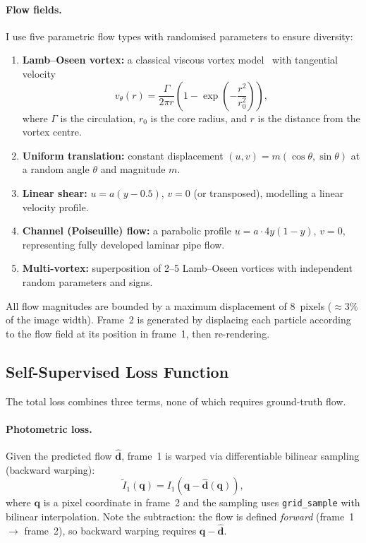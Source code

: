 \documentclass[11pt, a4paper]{article}
\newcommand{\vect}[1]{\bm{#1}}
\begin{document}
\paragraph{Flow fields.}
I use five parametric flow types with randomised parameters to ensure diversity:
\begin{enumerate}
    \item \textbf{Lamb--Oseen vortex:} a classical viscous vortex model~\cite{lamb1932hydrodynamics} with tangential velocity
    \begin{equation}
        v_\theta(r) = \frac{\Gamma}{2\pi r}\left(1 - \exp\!\left(-\frac{r^2}{r_0^2}\right)\right),
        \label{eq:lamb_oseen}
    \end{equation}
    where $\Gamma$ is the circulation, $r_0$ is the core radius, and $r$ is the distance from the vortex centre.
    \item \textbf{Uniform translation:} constant displacement $(u, v) = m(\cos\theta, \sin\theta)$ at a random angle $\theta$ and magnitude $m$.
    \item \textbf{Linear shear:} $u = a(y - 0.5)$, $v = 0$ (or transposed), modelling a linear velocity profile.
    \item \textbf{Channel (Poiseuille) flow:} a parabolic profile $u = a \cdot 4y(1-y)$, $v = 0$, representing fully developed laminar pipe flow.
    \item \textbf{Multi-vortex:} superposition of 2--5 Lamb--Oseen vortices with independent random parameters and signs.
\end{enumerate}
All flow magnitudes are bounded by a maximum displacement of 8~pixels ($\approx 3\%$ of the image width).
Frame~2 is generated by displacing each particle according to the flow field at its position in frame~1, then re-rendering.

\subsection{Self-Supervised Loss Function}
\label{sec:loss}

The total loss combines three terms, none of which requires ground-truth flow.

\paragraph{Photometric loss.}
Given the predicted flow $\hat{\vect{d}}$, frame~1 is warped via differentiable bilinear sampling (backward warping):
\begin{equation}
    \tilde{I}_1(\vect{q}) = I_1\!\left(\vect{q} - \hat{\vect{d}}(\vect{q})\right),
    \label{eq:warp}
\end{equation}
where $\vect{q}$ is a pixel coordinate in frame~2 and the sampling uses \texttt{grid\_sample} with bilinear interpolation.
Note the subtraction: the flow is defined \emph{forward} (frame~1 $\to$ frame~2), so backward warping requires $\vect{q} - \hat{\vect{d}}$.
\end{document}
